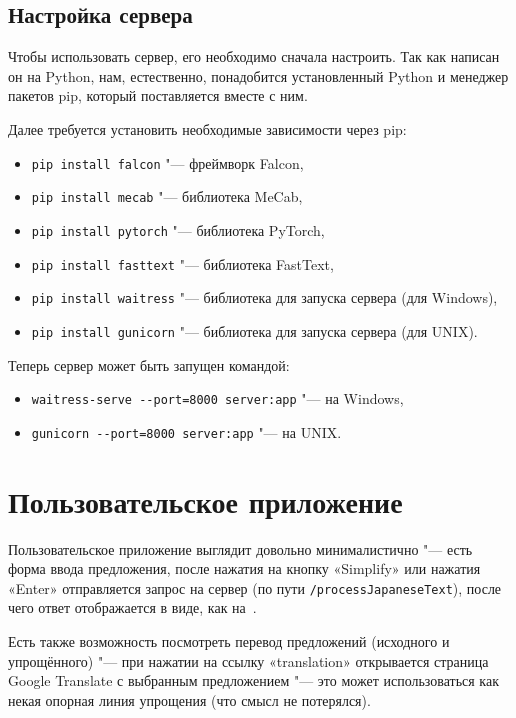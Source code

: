 \subsection{Настройка сервера}


Чтобы использовать сервер, его необходимо сначала настроить.
Так как написан он на Python, нам, естественно, понадобится установленный Python и менеджер пакетов pip, который поставляется вместе с ним.

Далее требуется установить необходимые зависимости через pip:
\begin{itemize}%
  \item \texttt{pip install falcon} "--- фреймворк Falcon,
  \item \texttt{pip install mecab} "--- библиотека MeCab,
  \item \texttt{pip install pytorch} "--- библиотека PyTorch,
  \item \texttt{pip install fasttext} "--- библиотека FastText,
  \item \texttt{pip install waitress} "--- библиотека для запуска сервера (для Windows),
  \item \texttt{pip install gunicorn} "--- библиотека для запуска сервера (для UNIX).
\end{itemize}

Теперь сервер может быть запущен командой:
\begin{itemize}%
  \item \texttt{waitress-serve -{}-port=8000 server:app} "--- на Windows,
  \item \texttt{gunicorn -{}-port=8000 server:app} "--- на UNIX.
\end{itemize}


\section{Пользовательское приложение}


Пользовательское приложение выглядит довольно минималистично "--- есть форма ввода предложения, после нажатия на кнопку «Simplify» или нажатия «Enter» отправляется запрос на сервер (по пути \texttt{/processJapaneseText}), после чего ответ отображается в виде, как на~.

Есть также возможность посмотреть перевод предложений (исходного и упрощённого) "--- при нажатии на ссылку «translation» открывается страница Google Translate с выбранным предложением "--- это может использоваться как некая опорная линия упрощения (что смысл не потерялся).

